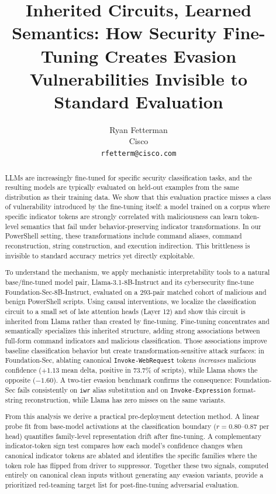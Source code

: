 \documentclass{article}
\title{Inherited Circuits, Learned Semantics: How Security Fine-Tuning Creates Evasion Vulnerabilities Invisible to Standard Evaluation}
\author{%
  Ryan Fetterman \\
  Cisco\\
   \texttt{rfetterm@cisco.com}
}
\date{}
\begin{document}
\raggedbottom

\maketitle
\begin{abstract}
LLMs are increasingly fine-tuned for specific security classification tasks, and the resulting models are typically evaluated on held-out examples from the same distribution as their training data. We show that this evaluation practice misses a class of vulnerability introduced by the fine-tuning itself: a model trained on a corpus where specific indicator tokens are strongly correlated with maliciousness can learn token-level semantics that fail under behavior-preserving indicator transformations. In our PowerShell setting, these transformations include command aliases, command reconstruction, string construction, and execution indirection. This brittleness is invisible to standard accuracy metrics yet directly exploitable.

To understand the mechanism, we apply mechanistic interpretability tools to a natural base/fine-tuned model pair, Llama-3.1-8B-Instruct and its cybersecurity fine-tune Foundation-Sec-8B-Instruct, evaluated on a 293-pair matched cohort of malicious and benign PowerShell scripts. Using causal interventions, we localize the classification circuit to a small set of late attention heads (Layer 12) and show this circuit is inherited from Llama rather than created by fine-tuning. Fine-tuning concentrates and semantically specializes this inherited structure, adding strong associations between full-form command indicators and malicious classification. Those associations improve baseline classification behavior but create transformation-sensitive attack surfaces: in Foundation-Sec, ablating canonical \texttt{Invoke-WebRequest} tokens \emph{increases} malicious confidence (\(+1.13\) mean delta, positive in 73.7\% of scripts), while Llama shows the opposite (\(-1.60\)). A two-tier evasion benchmark confirms the consequence: Foundation-Sec fails consistently on \texttt{iwr} alias substitution and on \texttt{Invoke-Expression} format-string reconstruction, while Llama has zero misses on the same variants.

From this analysis we derive a practical pre-deployment detection method. A linear probe fit from base-model activations at the classification boundary (\(r = 0.80\)--\(0.87\) per head) quantifies family-level representation drift after fine-tuning. A complementary indicator-token sign test compares how each model’s confidence changes when canonical indicator tokens are ablated and identifies the specific families where the token role has flipped from driver to suppressor. Together these two signals, computed entirely on canonical clean inputs without generating any evasion variants, provide a prioritized red-teaming target list for post-fine-tuning adversarial evaluation.
\end{abstract}
\end{document}
